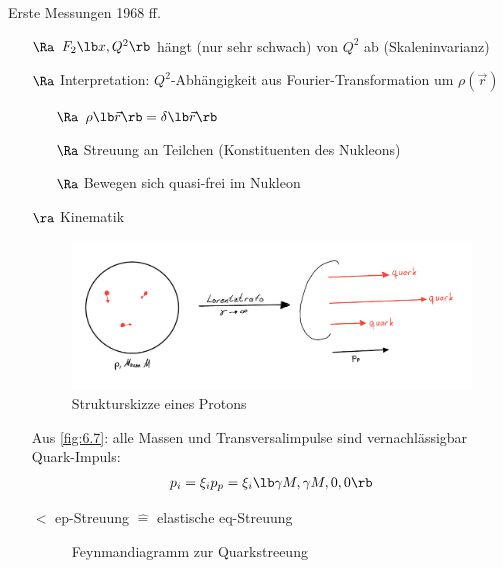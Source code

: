 \begin{itemize}
Erste Messungen 1968 ff.
\begin{itemize}
\item[$\Ra$] $F_2\lb  x, Q^2\rb $ hängt (nur sehr schwach) von $Q^2$ ab (\glqq Skaleninvarianz\grqq)
\item[$\Ra$] Interpretation: $Q^2$-Abhängigkeit aus Fourier-Transformation um $\rho (\vec r)$
\begin{itemize}
\item[$\Ra$] $\rho \lb \vec{r}\rb  = \delta \lb  \vec{r}\rb $
\item[$\Ra$] Streuung an  Teilchen (Konstituenten des Nukleons)
\item[$\Ra$]  Bewegen sich \glqq quasi-frei\grqq{} im Nukleon
\end{itemize}
\item[$\ra$] Kinematik
\begin{figure}[!ht]
\centering
\includegraphics[width=.6\textwidth]{imgs/ep5-fig-6-7.pdf}
\caption{Strukturskizze eines Protons\label{fig:6.7}}
\end{figure}

\ni Aus \autoref{fig:6.7}: alle Massen und Transversalimpulse sind vernachlässigbar\\
Quark-Impuls:
\begin{align}
p_i = \xi_i p_p= \xi_i \lb \gamma M , \gamma M, 0, 0\rb 
\end{align}

\item[$\lt$] ep-Streuung $\hat{=}$ elastische eq-Streuung

\begin{figure}[!ht]
\centering
\caption{Feynmandiagramm zur Quarkstreeung\label{fig:6.8}}
\end{figure}


\end{itemize}
\end{itemize}
